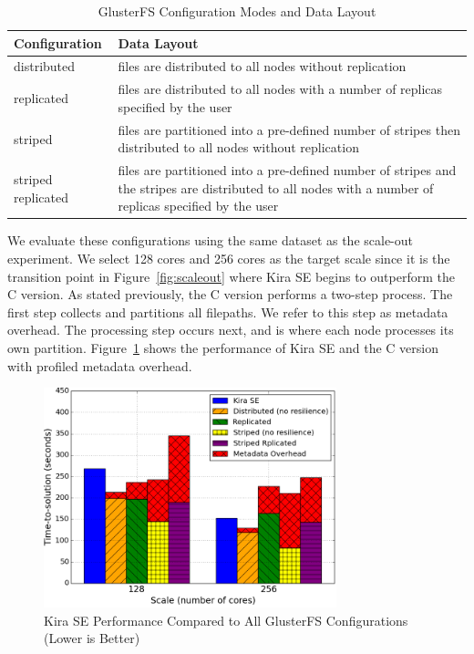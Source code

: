 \documentclass[10pt, conference, compsocconf]{IEEEtran}
\newcommand{\up}{\vspace*{-1em}}
\begin{document}
\begin{table}[h]
  \begin{center}
  \caption{GlusterFS Configuration Modes and Data Layout}
    \begin{small}
    \begin{tabular}{ | p{1.65cm} | p{6cm} |}
    \hline
    Configuration & Data Layout \\ \hline \hline
    distributed & files are distributed to all nodes without replication  \\ \hline
    replicated & files are distributed to all nodes with a number of replicas specified by the user \\ \hline  
    striped & files are partitioned into a pre-defined number of stripes then distributed to all nodes without replication \\ \hline
    striped replicated & files are partitioned into a pre-defined number of stripes and the stripes are distributed to all nodes with a number of replicas specified by the user \\ \hline
    \end{tabular}
    \end{small}   
  \label{tb:gluster-conf}     	
  \end{center}
\end{table}

We evaluate these configurations using the same dataset as the scale-out experiment. We
select 128 cores and 256 cores as the target scale since it is the transition point in
Figure~\ref{fig:scaleout} where Kira SE begins to outperform the C version. As stated
previously, the C version performs a two-step process. The first step collects and
partitions all filepaths. We refer to this step as metadata overhead. The processing
step occurs next, and is where each node processes its own partition.
Figure~\ref{fig:allgluster} shows the performance of Kira SE and the C version with
profiled metadata overhead.  

\begin{figure}[h]
	\begin{center}
		\includegraphics[width=85mm]{pictures/allgluster}
		\caption{Kira SE Performance Compared to All GlusterFS Configurations (Lower is Better)
		\label{fig:allgluster}}
		\up
  	\end{center}
\end{figure}
\end{document}
